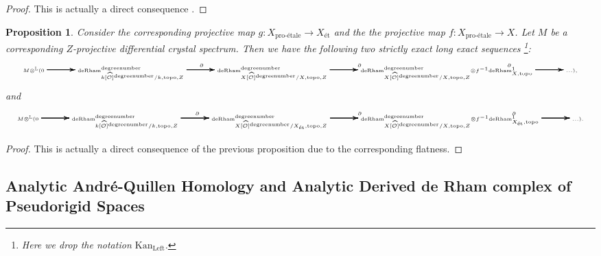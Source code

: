 \documentclass[11pt]{book}
\newtheorem{proposition}[theorem]{Proposition}
\theoremstyle{definition}
\numberwithin{equation}{section}
\begin{document}
\begin{landscape}
\begin{proof}
This is actually a direct consequence \cite[Theorem 1.2]{12GL}.	
\end{proof}




\begin{proposition}
Consider the corresponding projective map $g:X_{\text{pro-\'etale}}\rightarrow X_{\text{\'et}}$ and the the projective map $f:X_{\text{pro-\'etale}}\rightarrow X$. Let $M$ be a corresponding $Z$-projective differential crystal spectrum. Then we have the following two strictly exact long exact sequences \footnote{Here we drop the notation $\mathrm{Kan}_\mathrm{Left}$.}:
\[\tiny
\xymatrix@C+0.4pc@R+0pc{
M{\otimes}^\mathbb{L}(0\ar[r]\ar[r]\ar[r] \ar[r] &\mathrm{deRham}^\text{degreenumber}_{k[\widehat{\mathcal{O}}]^\text{degreenumber}/k,\mathrm{topo},Z} \ar[r]^\partial\ar[r]\ar[r] \ar[r] &\mathrm{deRham}^\text{degreenumber}_{X[\widehat{\mathcal{O}}]^\text{degreenumber}/X,\mathrm{topo},Z} \ar[r]^\partial\ar[r]\ar[r] \ar[r] &\mathrm{deRham}^\text{degreenumber}_{X[\widehat{\mathcal{O}}]^\text{degreenumber}/X,\mathrm{topo},Z}{\otimes}f^{-1} \mathrm{deRham}^1_{X,\mathrm{topo}} \ar[r]^\partial\ar[r]\ar[r] \ar[r] &...),
}
\]
and
\[\tiny
\xymatrix@C+0.4pc@R+0pc{
M{\otimes}^\mathbb{L}(0\ar[r]\ar[r]\ar[r] \ar[r] &\mathrm{deRham}^\text{degreenumber}_{k[\widehat{\mathcal{O}}]^\text{degreenumber}/k,\mathrm{topo},Z} \ar[r]^\partial\ar[r]\ar[r] \ar[r] &\mathrm{deRham}^\text{degreenumber}_{X[\widehat{\mathcal{O}}]^\text{degreenumber}/X_{\text{\'et}},\mathrm{topo},Z} \ar[r]^\partial\ar[r]\ar[r] \ar[r] &\mathrm{deRham}^\text{degreenumber}_{X[\widehat{\mathcal{O}}]^\text{degreenumber}/X,\mathrm{topo},Z}{\otimes}f^{-1} \mathrm{deRham}^1_{X_{\text{\'et}},\mathrm{topo}} \ar[r]^\partial\ar[r]\ar[r] \ar[r] &...).
}
\]
\end{proposition}



\begin{proof}
This is actually a direct consequence of the previous proposition due to the corresponding flatness.	
\end{proof}

\end{landscape}




\newpage


\subsection{Analytic Andr\'e-Quillen Homology and Analytic Derived de Rham complex of Pseudorigid Spaces}
\end{document}
